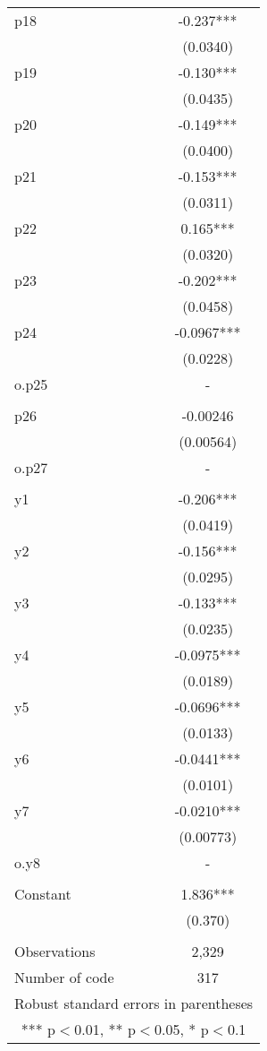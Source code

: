 \documentclass[]{article}
\begin{document}
\begin{tabular}{lc}
p18 & -0.237*** \\
 & (0.0340) \\
p19 & -0.130*** \\
 & (0.0435) \\
p20 & -0.149*** \\
 & (0.0400) \\
p21 & -0.153*** \\
 & (0.0311) \\
p22 & 0.165*** \\
 & (0.0320) \\
p23 & -0.202*** \\
 & (0.0458) \\
p24 & -0.0967*** \\
 & (0.0228) \\
o.p25 & - \\
 &  \\
p26 & -0.00246 \\
 & (0.00564) \\
o.p27 & - \\
 &  \\
y1 & -0.206*** \\
 & (0.0419) \\
y2 & -0.156*** \\
 & (0.0295) \\
y3 & -0.133*** \\
 & (0.0235) \\
y4 & -0.0975*** \\
 & (0.0189) \\
y5 & -0.0696*** \\
 & (0.0133) \\
y6 & -0.0441*** \\
 & (0.0101) \\
y7 & -0.0210*** \\
 & (0.00773) \\
o.y8 & - \\
 &  \\
Constant & 1.836*** \\
 & (0.370) \\
 &  \\
Observations & 2,329 \\
 Number of code & 317 \\ \hline
\multicolumn{2}{c}{ Robust standard errors in parentheses} \\
\multicolumn{2}{c}{ *** p$<$0.01, ** p$<$0.05, * p$<$0.1} \\
\end{tabular}
\end{document}
